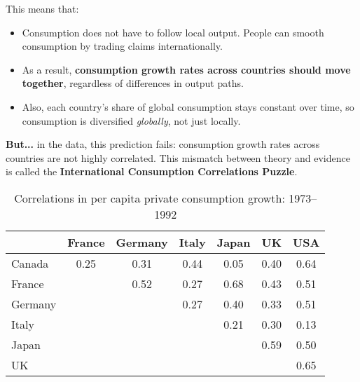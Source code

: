 \documentclass[12pt]{article}
\begin{document}
This means that:
\begin{itemize}
    \item Consumption does not have to follow local output. People can smooth consumption by trading claims internationally.
    \item As a result, \textbf{consumption growth rates across countries should move together}, regardless of differences in output paths.
    \item Also, each country's share of global consumption stays constant over time, so consumption is diversified \textit{globally}, not just locally.
\end{itemize}

\textbf{But...} in the data, this prediction fails: consumption growth rates across countries are not highly correlated. This mismatch between theory and evidence is called the \textbf{International Consumption Correlations Puzzle}.

\begin{table}[H]
\centering
\caption{Correlations in per capita private consumption growth: 1973--1992}
\begin{tabular}{lcccccc}
\toprule
         & France & Germany & Italy & Japan & UK & USA \\
\midrule
Canada  & 0.25   & 0.31    & 0.44  & 0.05  & 0.40 & 0.64 \\
France  &        & 0.52    & 0.27  & 0.68  & 0.43 & 0.51 \\
Germany &        &         & 0.27  & 0.40  & 0.33 & 0.51 \\
Italy   &        &         &       & 0.21  & 0.30 & 0.13 \\
Japan   &        &         &       &       & 0.59 & 0.50 \\
UK      &        &         &       &       &      & 0.65 \\
\bottomrule
\end{tabular}
\end{table}
\end{document}
